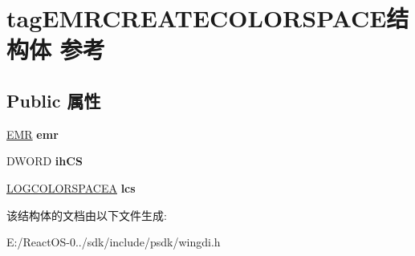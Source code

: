 \hypertarget{structtag_e_m_r_c_r_e_a_t_e_c_o_l_o_r_s_p_a_c_e}{}\section{tag\+E\+M\+R\+C\+R\+E\+A\+T\+E\+C\+O\+L\+O\+R\+S\+P\+A\+C\+E结构体 参考}
\label{structtag_e_m_r_c_r_e_a_t_e_c_o_l_o_r_s_p_a_c_e}
\subsection*{Public 属性}
\begin{DoxyCompactItemize}
\item 
\mbox{\label{structtag_e_m_r_c_r_e_a_t_e_c_o_l_o_r_s_p_a_c_e_ad5e7851ceba459624a7a5dcdc5930efc}} 
\hyperlink{structtag_e_m_r}{E\+MR} {\bfseries emr}
\item 
\mbox{\label{structtag_e_m_r_c_r_e_a_t_e_c_o_l_o_r_s_p_a_c_e_ae9df5b1f642c64644053180094c12f9c}} 
D\+W\+O\+RD {\bfseries ih\+CS}
\item 
\mbox{\label{structtag_e_m_r_c_r_e_a_t_e_c_o_l_o_r_s_p_a_c_e_a822cc56df2ac3e97ec670469a9aa62aa}} 
\hyperlink{structtag_l_o_g_c_o_l_o_r_s_p_a_c_e_a}{L\+O\+G\+C\+O\+L\+O\+R\+S\+P\+A\+C\+EA} {\bfseries lcs}
\end{DoxyCompactItemize}


该结构体的文档由以下文件生成\+:\begin{DoxyCompactItemize}
\item 
E\+:/\+React\+O\+S-\/0../sdk/include/psdk/wingdi.\+h\end{DoxyCompactItemize}

